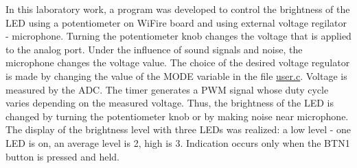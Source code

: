 In this laboratory work, a program was developed to control the brightness of the L\+ED using a potentiometer on Wi\+Fire board and using external voltage regilator -\/ microphone. Turning the potentiometer knob changes the voltage that is applied to the analog port. Under the influence of sound signals and noise, the microphone changes the voltage value. The choice of the desired voltage regulator is made by changing the value of the M\+O\+DE variable in the file \hyperlink{user_8c}{user.\+c}. Voltage is measured by the A\+DC. The timer generates a P\+WM signal whose duty cycle varies depending on the measured voltage. Thus, the brightness of the L\+ED is changed by turning the potentiometer knob or by making noise near microphone. The display of the brightness level with three L\+E\+Ds was realized\+: a low level -\/ one L\+ED is on, an average level is 2, high is 3. Indication occurs only when the B\+T\+N1 button is pressed and held. 